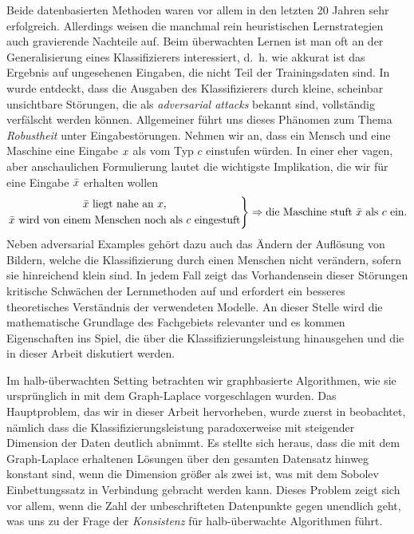 Beide datenbasierten Methoden waren vor allem in den letzten 20 Jahren sehr erfolgreich. Allerdings weisen die manchmal rein heuristischen Lernstrategien auch gravierende Nachteile auf. Beim überwachten Lernen ist man oft an der Generalisierung eines Klassifizierers interessiert, d.~h. wie akkurat ist das Ergebnis auf ungesehenen Eingaben, die nicht Teil der Trainingsdaten sind. In \cite{goodfellow2014explaining} wurde entdeckt, dass die Ausgaben des Klassifizierers durch kleine, scheinbar unsichtbare Störungen, die als \textit{adversarial attacks} bekannt sind, vollständig verfälscht werden können. Allgemeiner führt uns dieses Phänomen zum Thema \textit{Robustheit} unter Eingabestörungen. Nehmen wir an, dass ein Mensch und eine Maschine eine Eingabe $x$ als vom Typ $c$ einstufen würden. In einer eher vagen, aber anschaulichen Formulierung lautet die wichtigste Implikation, die wir für eine Eingabe $\bar{x}$ erhalten wollen
%
\begin{align*}
\left.
\begin{gathered}
\bar{x}\text{ liegt nahe an }x,\\
\bar{x}\text{ wird von einem Menschen noch als }c\text{ eingestuft}
\end{gathered}
\right\}
\Rightarrow
\text{die Maschine stuft }\bar{x}\text{ als }c  \text{ ein.} 
\end{align*}
%
Neben adversarial Examples gehört dazu auch das Ändern der Auflösung von Bildern, welche die Klassifizierung durch einen Menschen nicht verändern, sofern sie hinreichend klein sind. In jedem Fall zeigt das Vorhandensein dieser Störungen kritische Schwächen der Lernmethoden auf und erfordert ein besseres theoretisches Verständnis der verwendeten Modelle. An dieser Stelle wird die mathematische Grundlage des Fachgebiets relevanter und es kommen Eigenschaften ins Spiel, die über die Klassifizierungsleistung hinausgehen und die in dieser Arbeit diskutiert werden.

Im halb-überwachten Setting betrachten wir graphbasierte Algorithmen, wie sie ursprünglich in \cite{zhu2003semi} mit dem Graph-Laplace vorgeschlagen wurden. Das Hauptproblem, das wir in dieser Arbeit hervorheben, wurde zuerst in \cite{nadler2009statistical} beobachtet, nämlich dass die Klassifizierungsleistung paradoxerweise mit steigender Dimension der Daten deutlich abnimmt. Es stellte sich heraus, dass die mit dem Graph-Laplace erhaltenen Lösungen über den gesamten Datensatz hinweg konstant sind, wenn die Dimension grö\ss{}er als zwei ist, was mit dem Sobolev Einbettungssatz \cite{adams2003sobolev} in Verbindung gebracht werden kann. Dieses Problem zeigt sich vor allem, wenn die Zahl der unbeschrifteten Datenpunkte gegen unendlich geht, was uns zu der Frage der \textit{Konsistenz} für halb-überwachte Algorithmen führt.

